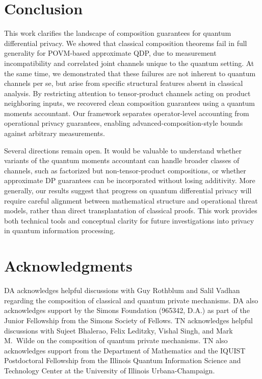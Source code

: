\documentclass[11pt]{article}
\theoremstyle{plain}
\theoremstyle{remark}
\begin{document}
\section{Conclusion}
\label{sec:conclusion}

This work clarifies the landscape of composition guarantees for quantum differential privacy.
We showed that classical composition theorems fail in full generality for POVM-based approximate QDP, due to measurement incompatibility and correlated joint channels unique to the quantum setting.
At the same time, we demonstrated that these failures are not inherent to quantum channels per se, but arise from specific structural features absent in classical analysis. By restricting attention to tensor-product channels acting on product neighboring inputs, we recovered clean composition guarantees using a quantum moments accountant.
Our framework separates operator-level accounting from operational privacy guarantees, enabling advanced-composition-style bounds against arbitrary measurements. %

Several directions remain open.
It would be valuable to understand whether variants of the quantum moments accountant can handle broader classes of channels, such as factorized but non-tensor-product compositions, or whether approximate DP guarantees can be incorporated without losing additivity.
More generally, our results suggest that progress on quantum differential privacy will require careful alignment between mathematical structure and operational threat models, rather than direct transplantation of classical proofs. This work provides both technical tools and conceptual clarity for future investigations into privacy in quantum information processing.

\section*{Acknowledgments}

DA acknowledges helpful discussions with Guy Rothblum and Salil Vadhan regarding the composition of classical and quantum private mechanisms. DA also acknowledges support by the Simons Foundation (965342, D.A.) as part of the
Junior Fellowship from the Simons Society of Fellows.
TN acknowledges helpful discussions with Sujeet Bhalerao, Felix Leditzky, Vishal Singh, and Mark M.~Wilde on the composition of quantum private mechanisms.
 TN also acknowledges support from the
Department of Mathematics and the IQUIST Postdoctoral Fellowship from
the Illinois Quantum Information Science and Technology Center at
the University of Illinois Urbana-Champaign.
\end{document}
